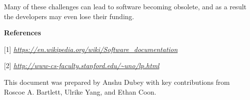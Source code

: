 \documentclass[]{article}
\begin{document}
Many of these challenges can lead to software becoming obsolete, and as
a result the developers may even lose their funding.

\textbf{References}

{[}1{]}
\href{https://en.wikipedia.org/wiki/Software_documentation}{\emph{https://en.wikipedia.org/wiki/Software\_documentation}}

{[}2{]}
\href{http://www-cs-faculty.stanford.edu/~uno/lp.html}{\emph{http://www-cs-faculty.stanford.edu/\textasciitilde{}uno/lp.html}}

This document was prepared by Anshu Dubey with key contributions from
Roscoe A. Bartlett, Ulrike Yang, and Ethan Coon.
\end{document}
